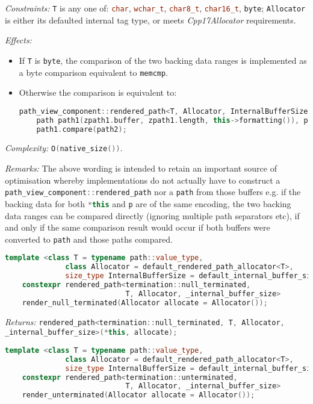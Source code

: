 \documentclass[11pt]{article}
\newcommand{\code}[2][cpp]{\lstinline[language=#1,basicstyle=\small\ttfamily]{#2}}
\newcommand{\desc}[1]{\textit{#1}}
\newcommand{\constraints}{\desc{Constraints: }}
\newcommand{\effects}{\desc{Effects: }}
\newcommand{\returns}{\desc{Returns: }}
\newcommand{\remarks}{\desc{Remarks: }}
\newcommand{\complexity}{\desc{Complexity: }}
\begin{document}
\constraints \code{T} is any one of: \code{char}, \code{wchar_t}, \code{char8_t}, \code{char16_t}, \code{byte}; \code{Allocator} is either its defaulted internal tag type, or meets \emph{Cpp17Allocator} requirements.

\effects
\begin{itemize}
    \item If \code{T} is \code{byte}, the comparison of the two backing data ranges is implemented as a byte comparison equivalent to \code{memcmp}.
    \item Otherwise the comparison is equivalent to:
    \begin{lstlisting}[language=cpp]
    path_view_component::rendered_path<T, Allocator, InternalBufferSize> zpath1(*this), zpath2(p);
    path path1(zpath1.buffer, zpath1.length, this->formatting()), path2(zpath2.buffer, zpath2.length, p.formatting());
    path1.compare(path2);
    \end{lstlisting}
\end{itemize}

\complexity \code{O(native_size())}.

\remarks{The above wording is intended to retain an important source of optimisation whereby implementations do not actually have to construct a \code{path_view_component::rendered_path} nor a \code{path} from those buffers e.g. if the backing data for both \code{*this} and \code{p} are of the same encoding, the two backing data ranges can be compared directly (ignoring multiple path separators etc), if and only if the same comparison result would occur if both buffers were converted to \code{path} and those paths compared.}\\

\color{darkgreen}


\begin{lstlisting}[language=cpp]
    template <class T = typename path::value_type,
              class Allocator = default_rendered_path_allocator<T>,
              size_type InternalBufferSize = default_internal_buffer_size>
    constexpr rendered_path<termination::null_terminated,
                            T, Allocator, _internal_buffer_size>
    render_null_terminated(Allocator allocate = Allocator());
\end{lstlisting}

\returns \code{rendered_path<termination::null_terminated, T, Allocator, _internal_buffer_size>(*this, allocate);}\\


\begin{lstlisting}[language=cpp]
    template <class T = typename path::value_type,
              class Allocator = default_rendered_path_allocator<T>,
              size_type InternalBufferSize = default_internal_buffer_size>
    constexpr rendered_path<termination::unterminated,
                            T, Allocator, _internal_buffer_size>
    render_unterminated(Allocator allocate = Allocator());
\end{lstlisting}
\end{document}
